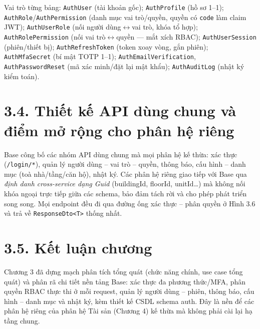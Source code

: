 

Vai trò từng bảng: \texttt{AuthUser} (tài khoản gốc); \texttt{AuthProfile} (hồ sơ 1--1); \texttt{AuthRole}/\texttt{AuthPermission} (danh mục vai trò/quyền, quyền có \texttt{code} làm claim JWT); \texttt{AuthUserRole} (nối người dùng$\leftrightarrow$vai trò, khóa tổ hợp); \texttt{AuthRolePermission} (nối vai trò$\leftrightarrow$quyền — mắt xích RBAC); \texttt{AuthUserSession} (phiên/thiết bị); \texttt{AuthRefreshToken} (token xoay vòng, gắn phiên); \texttt{AuthMfaSecret} (bí mật TOTP 1--1); \texttt{AuthEmailVerification}, \texttt{AuthPasswordReset} (mã xác minh/đặt lại mật khẩu); \texttt{AuthAuditLog} (nhật ký kiểm toán).

\section*{3.4. Thiết kế API dùng chung và điểm mở rộng cho phân hệ riêng}
Base công bố các nhóm API dùng chung mà mọi phân hệ kế thừa: xác thực (\texttt{/login/*}), quản lý người dùng -- vai trò -- quyền, thông báo, cấu hình -- danh mục (toà nhà/tầng/căn hộ), nhật ký. Các phân hệ riêng giao tiếp với Base qua \emph{định danh cross-service dạng Guid} (buildingId, floorId, unitId\ldots{}) mà không nối khóa ngoại trực tiếp giữa các schema, bảo đảm tách rời và cho phép phát triển song song. Mọi endpoint đều đi qua đường ống xác thực -- phân quyền ở Hình 3.6 và trả về \texttt{ResponseDto<T>} thống nhất.

\section*{3.5. Kết luận chương}
Chương 3 đã dựng mạch phân tích tổng quát (chức năng chính, use case tổng quát) và phân rã chi tiết nền tảng Base: xác thực đa phương thức/MFA, phân quyền RBAC thực thi ở mỗi request, quản lý người dùng -- phiên, thông báo, cấu hình -- danh mục và nhật ký, kèm thiết kế CSDL schema auth. Đây là nền để các phân hệ riêng của phân hệ Tài sản (Chương 4) kế thừa mà không phải cài lại hạ tầng chung.

